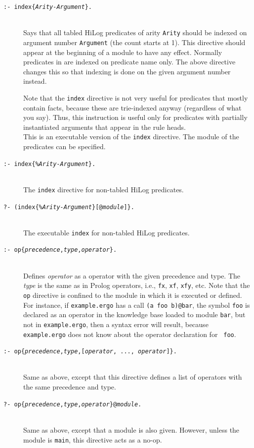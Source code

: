 \documentclass[11pt]{article}
\newcommand{\ERGO}{\mbox{\smaller{\ensuremath{\cal{E}}\smaller{{\sc{RGO}}}}}\xspace}
\newcommand{\FLSYSTEM}{\ERGO}
\newcommand{\ergoext}{ergo\xspace}
\begin{document}
\begin{description}
\item[\texttt{:- index\{\emph{Arity-Argument}\}.}]
  ~~~\\
  Says that all tabled HiLog predicates of arity {\tt Arity} should be indexed on
  argument number {\tt Argument} (the count starts at 1). This directive
  should appear at the beginning of a module to have any effect.
  Normally predicates in \FLSYSTEM are indexed on predicate name only.
  The  above directive changes this so that indexing is done on the given
  argument number instead.

  Note that the {\tt index} directive is not very useful for predicates
  that mostly contain facts, because these are trie-indexed anyway
  (regardless of what you say). Thus, this instruction is useful only for
  predicates with partially instantiated arguments that appear in the rule
  heads.
~~~  \\
  This is an executable version of the {\tt index} directive.  The
  module of the predicates can be specified.
\item[\texttt{:- index\{\emph{\%Arity-Argument}\}.}]
~~~  \\
  The {\tt index} directive for non-tabled HiLog predicates.
\item[\texttt{?- (index\{\emph{\%Arity-Argument}\}[@\emph{module}]\}.}]
~~~  \\
  The executable {\tt index} for non-tabled HiLog predicates.

\item[\texttt{:- op\{{\it precedence},{\it type},{\it operator}\}.}]
 ~~~ \\
  Defines \emph{operator} as a \FLSYSTEM operator with the given precedence
  and type. The \emph{type} is the same as in Prolog operators, i.e.,
  {\tt fx}, {\tt xf}, {\tt xfy}, etc.
  Note that the {\tt op} directive is confined to
  the module in which it is executed or defined. For instance, if
  {\tt example.\ergoext} has a call {\tt (a foo b)@bar}, the symbol {\tt foo} is
  declared as an operator in the knowledge base loaded to module {\tt bar}, but not in
  {\tt example.\ergoext}, then a syntax error will result, because 
   {\tt example.\ergoext} does not know about the operator declaration for {\tt
  foo}.
\item[\texttt{:- op\{{\it precedence},{\it type},[{\it operator}, ..., {\it operator}]\}.}]
~~~  \\
  Same as above, except that this directive defines a list of operators
  with the same precedence and type.
\item[\texttt{?- op\{{\it precedence},{\it type},{\it operator}\}@\emph{module}.}]
 ~~~ \\
  Same as above, except that a module is also given. However, unless the
  module is {\tt main}, this directive acts as a no-op.
\end{description}
\end{document}
